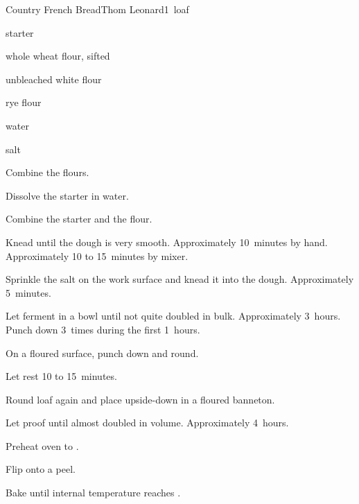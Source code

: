 \begin{recipe}{Country French Bread}{Thom Leonard}{1~loaf}

\begin{ingredients}
\item {} starter
\item {} whole wheat flour, sifted
\item {} unbleached white flour
\item {} rye flour
\item {} water
\item {} salt
\end{ingredients}

\begin{directions}
\item Combine the flours.
\item Dissolve the starter in water.
\item Combine the starter and the flour.
\item Knead until the dough is very smooth. Approximately 10~minutes by hand. Approximately 10 to 15~minutes by mixer.
\item Sprinkle the salt on the work surface and knead it into the dough. Approximately 5~minutes.
\item Let ferment in a bowl until not quite doubled in bulk. Approximately 3~hours. Punch down 3~times during the first 1\half{}~hours.
\item On a floured surface, punch down and round.
\item Let rest 10 to 15~minutes.
\item Round loaf again and place upside-down in a floured banneton.
\item Let proof until almost doubled in volume. Approximately 4~hours.
\item Preheat oven to .
\item Flip onto a peel.
\item Bake until internal temperature reaches .
\end{directions}

\end{recipe}

